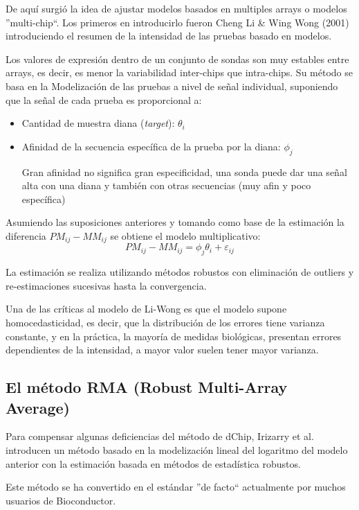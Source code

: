 De aqu\'i surgi\'o la idea de ajustar modelos basados en multiples arrays o modelos ''multi-chip``.
Los primeros en introducirlo fueron Cheng Li \& Wing Wong (2001) introduciendo el resumen de la intensidad de las pruebas basado en modelos.

Los valores de expresi\'on dentro de un conjunto de sondas son muy estables entre arrays, es decir,
es menor la variabilidad inter-chips que intra-chips. Su m\'etodo se basa en la Modelizaci\'on de las pruebas a nivel de se\~nal individual, suponiendo que la se\~nal de cada prueba es proporcional a:
\begin{itemize}
\item Cantidad de muestra diana (\emph{target}):  $\theta_i$
\item Afinidad de la secuencia espec\'ifica de la prueba por la diana: $\phi_j$

Gran afinidad no significa gran especificidad, una sonda puede dar una se\~nal alta con una diana y
tambi\'en con otras secuencias (muy afin y poco espec\'ifica)
\end{itemize}

Asumiendo las suposiciones anteriores y tomando como base de la estimaci\'on la diferencia $PM_{ij}-MM_{ij}$
se obtiene el modelo multiplicativo:
\begin{equation}
PM_{ij}-MM_{ij}=\phi_j \theta_i + \varepsilon_{ij}
\end{equation}

La estimaci\'on se realiza utilizando m\'etodos robustos con eliminaci\'on de outliers y
re-estimaciones sucesivas hasta la convergencia.

Una de las cr\'iticas al modelo de Li-Wong es que el modelo supone homocedasticidad, es decir, que la distribuci\'on
de los errores tiene varianza constante, y en la pr\'actica, la mayor\'ia de medidas biol\'ogicas, presentan errores dependientes de la intensidad, a mayor valor suelen tener mayor varianza.


\subsection{El m\'etodo RMA (Robust Multi-Array Average)}

Para compensar algunas deficiencias del m\'etodo de dChip, Irizarry et al. introducen un m\'etodo basado
en la modelizaci\'on lineal del logaritmo del modelo anterior con la estimaci\'on basada en m\'etodos de estad\'istica robustos.

Este m\'etodo se ha convertido en el est\'andar ''de facto`` actualmente por  muchos usuarios de Bioconductor.

